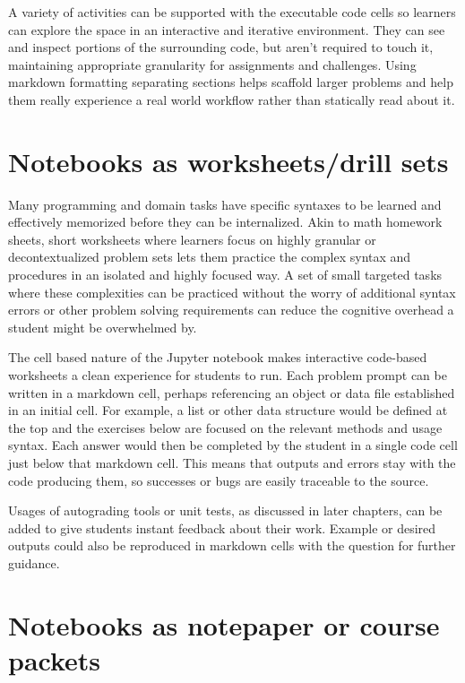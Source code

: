 \documentclass[]{book}
\begin{document}
A variety of activities can be supported with the executable code cells
so learners can explore the space in an interactive and iterative
environment. They can see and inspect portions of the surrounding code,
but aren't required to touch it, maintaining appropriate granularity for
assignments and challenges. Using markdown formatting separating
sections helps scaffold larger problems and help them really experience
a real world workflow rather than statically read about it.

\section{Notebooks as worksheets/drill
sets}\label{notebooks-as-worksheetsdrill-sets}

Many programming and domain tasks have specific syntaxes to be learned
and effectively memorized before they can be internalized. Akin to math
homework sheets, short worksheets where learners focus on highly
granular or decontextualized problem sets lets them practice the complex
syntax and procedures in an isolated and highly focused way. A set of
small targeted tasks where these complexities can be practiced without
the worry of additional syntax errors or other problem solving
requirements can reduce the cognitive overhead a student might be
overwhelmed by.

The cell based nature of the Jupyter notebook makes interactive
code-based worksheets a clean experience for students to run. Each
problem prompt can be written in a markdown cell, perhaps referencing an
object or data file established in an initial cell. For example, a list
or other data structure would be defined at the top and the exercises
below are focused on the relevant methods and usage syntax. Each answer
would then be completed by the student in a single code cell just below
that markdown cell. This means that outputs and errors stay with the
code producing them, so successes or bugs are easily traceable to the
source.

Usages of autograding tools or unit tests, as discussed in later
chapters, can be added to give students instant feedback about their
work. Example or desired outputs could also be reproduced in markdown
cells with the question for further guidance.

\section{Notebooks as notepaper or course
packets}\label{notebooks-as-notepaper-or-course-packets}
\end{document}
